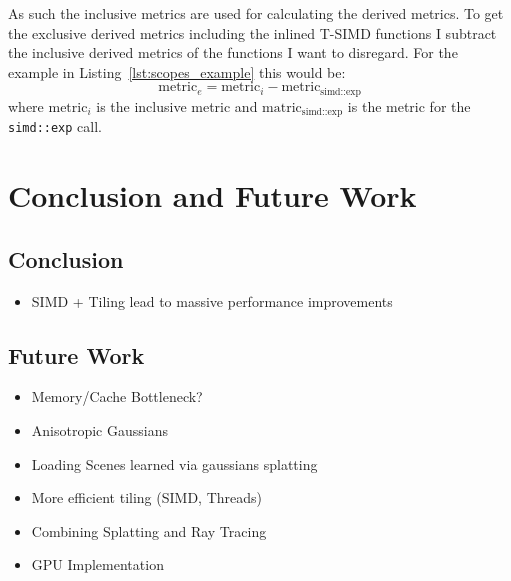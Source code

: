 \documentclass[a4paper, 11pt]{memoir}
\begin{document}
    As such the inclusive metrics are used for calculating the derived metrics. To get the exclusive derived metrics including the inlined T-SIMD functions I subtract
    the inclusive derived metrics of the functions I want to disregard. For the example in Listing~\ref{lst:scopes_example}
    this would be:
    \[ \text{metric}_e = \text{metric}_i - \text{metric}_{\text{simd::exp}} \]
    where $\text{metric}_i$ is the inclusive metric and $\text{matric}_{\text{simd::exp}}$ is the metric for the \texttt{simd::exp} call.


    \chapter{Conclusion and Future Work}
    \section{Conclusion}
    \begin{itemize}
        \item SIMD + Tiling lead to massive performance improvements
    \end{itemize}

    \section{Future Work}
    \begin{itemize}
        \item Memory/Cache Bottleneck?
        \item Anisotropic Gaussians
        \item Loading Scenes learned via gaussians splatting
        \item More efficient tiling (SIMD, Threads)
        \item Combining Splatting and Ray Tracing
        \item GPU Implementation
    \end{itemize}
\end{document}
